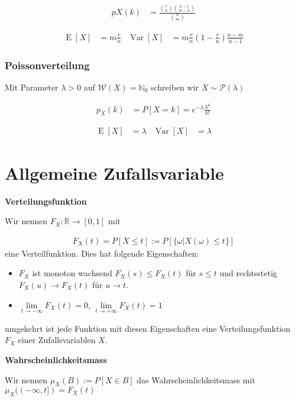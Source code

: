 \documentclass[25pt]{sciposter}
\newcommand{\R}{\mathbb{R}}
\newcommand{\N}{\mathbb{N}}
\newcommand{\W}{\mathcal{W}}
\newcommand{\Var}{\operatorname{Var}}
\newcommand{\E}{\operatorname{E}}
\newenvironment{method}[1]{\begin{mdframed}[backgroundcolor=blue!10,innertopmargin=15pt, innerbottommargin=15pt,nobreak=true]
		\textbf{#1 }
	}
	{ 
	\end{mdframed}
}
\begin{document}
\begin{multicols}{3}
\begin{align*}
	pX(k) &= \frac{{r\choose k} {n-r \choose m-k}}{{n \choose m}}
\end{align*}

\begin{align*}
\E[X] &= m\frac{r}{n} & \Var[X] &= m\frac{r}{n}\left(1-\frac{r}{n}\right) \frac{n-m}{n-1}
\end{align*}



\subsubsection*{Poissonverteilung}

Mit Parameter $\lambda>0$ auf $\W(X) = \N_0$ schreiben wir $X\sim \mathcal{P}(\lambda)$

\begin{align*}
	p_X(k) &= P[X = k] = e^{-\lambda} \frac{\lambda^k}{k!}
\end{align*}

\begin{align*}
\E[X] &= \lambda & \Var[X] &= \lambda
\end{align*}



\section{Allgemeine Zufallsvariable}



\begin{method}{Verteilungsfunktion}
	Wir nennen $F_X : \R \to [0,1]$ mit 
	
	\begin{align*}
		F_X (t) = P[X\leq t]:= P[\{\omega | X(\omega) \leq t\}]
	\end{align*}
	eine Verteilfunktion. Dies hat folgende Eigenschaften:
	\begin{itemize}
		\item $F_X$ ist monoton wachsend $F_X(s)\leq F_X(t)$ für $s\leq t$ und rechtsstetig $F_X(u) \to F_X(t)$ für $u \to t$.
		\item $\lim\limits_{t\to-\infty} F_X(t) = 0$, $\lim\limits_{t\to + \infty} F_X(t) = 1$ 
	\end{itemize}
	umgekehrt ist jede Funktion mit diesen Eigenschaften eine Verteilungsfunktion $F_X$ einer Zufallsvariablen $X$.
\end{method}


\begin{method}{Wahrscheinlichkeitsmass}
	Wir nennen $\mu_X(B) := P[X \in B]$ das Wahrscheinlichkeitsmass mit $\mu_X((-\infty,t]) = F_X(t)$
\end{method}


\end{multicols}
\end{document}
